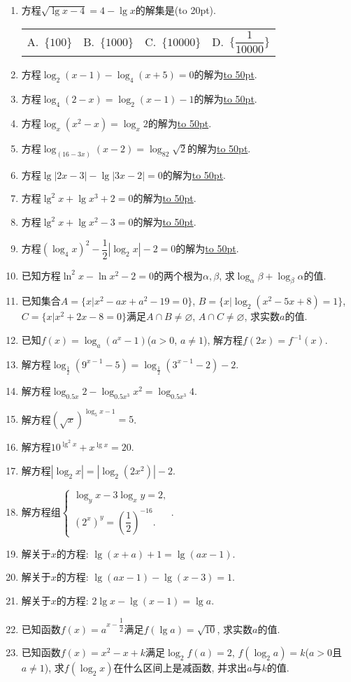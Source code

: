 \documentclass[10pt,a4paper]{article}
\newcommand{\blank}[1]{\underline{\hbox to #1pt{}}}
\newcommand{\bracket}[1]{(\hbox to #1pt{})}
\newcommand{\fourch}[4]{\par\begin{tabular}{p{.23\textwidth}p{.23\textwidth}p{.23\textwidth}p{.23\textwidth}}
A.~#1 &B.~#2& C.~#3& D.~#4
\end{tabular}}
\begin{document}
\begin{enumerate}[1.]
\item 方程$\sqrt {\lg x-4}=4-\lg x$的解集是\bracket{20}.
\fourch{$\{100\}$}{$\{1000\}$}{$\{10000\}$}{$\{\dfrac 1{10000}\}$}
\item 方程$\log_2(x-1)-\log_4(x+5)=0$的解为\blank{50}.
\item 方程$\log_4(2-x)=\log_2(x-1)-1$的解为\blank{50}.
\item 方程$\log_x(x^2-x)=\log_x2$的解为\blank{50}.
\item 方程$\log_{(16-3x)}(x-2)=\log_82\sqrt 2$的解为\blank{50}.
\item 方程$\lg|2x-3|-\lg|3x-2|=0$的解为\blank{50}.
\item 方程$\lg ^2x+\lg x^3+2=0$的解为\blank{50}.
\item 方程$\lg ^2x+\lg x^2-3=0$的解为\blank{50}.
\item 方程$(\log_4x)^2-\dfrac 12|\log_2x|-2=0$的解为\blank{50}.
\item 已知方程$\ln ^2x-\ln x^2-2=0$的两个根为$\alpha ,\beta$, 求$\log_{\alpha }\beta +\log_{\beta }\alpha$的值.
\item 已知集合$A=\{x|x^2-ax+a^2-19=0\}$, $B=\{x|\log_2(x^2-5x+8)=1\}$, $C=\{x|x^2+2x-8=0\}$满足$A\cap B\ne \varnothing$, $A\cap C\ne \varnothing$, 求实数$a$的值.
\item 已知$f(x)=\log_a(a^x-1)$($a>0$, $a\ne 1$), 解方程$f(2x)=f^{-1}(x)$.
\item 解方程$\log_{\frac 12}(9^{x-1}-5)=\log_{\frac 12}(3^{x-1}-2)-2$.
\item 解方程$\log_{0.5x}2-\log_{0.5x^3}x^2=\log_{0.5x^3}4$.
\item 解方程$(\sqrt x)^{\log_5x-1}=5$.
\item 解方程$10^{\lg ^2x}+x^{\lg x}=20$.
\item 解方程$|\log_2x|=|\log_2(2x^2)|-2$.
\item 解方程组$\begin{cases} \log_yx-3\log_xy=2, \\ (2^x)^y=(\dfrac 12)^{-16}. \end{cases}$.
\item 解关于$x$的方程: $\lg (x+a)+1=\lg (ax-1)$.
\item 解关于$x$的方程: $\lg (ax-1)-\lg (x-3)=1$.
\item 解关于$x$的方程: $2\lg x-\lg (x-1)=\lg a$.
\item 已知函数$f(x)=a^{x-\dfrac 12}$满足$f(\lg a)=\sqrt {10}$, 求实数$a$的值.
\item 已知函数$f(x)=x^2-x+k$满足$\log_2f(a)=2$, $f(\log_2a)=k$($a>0$且$a\ne 1$), 求$f(\log_2x)$在什么区间上是减函数, 并求出$a$与$k$的值.

\end{enumerate}
\end{document}
